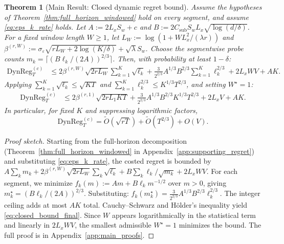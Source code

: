 \documentclass{article}
\newcommand{\DynReg}{\mathrm{DynReg}}
\newtheorem{theorem}{Theorem}
\begin{document}
\begin{theorem}[Main Result: Closed dynamic regret bound]
\label{thm:closed_dynamic_regret}
Assume the hypotheses of Theorem~\ref{thm:full_horizon_windowed} hold on every segment, and assume \eqref{eq:eps_k_rate} holds. Let
$A := 2L_x S_w + c$ and $B := 2 C_{\mathrm{sub}} S_w L_x \sqrt{\log(d/\delta)}$.
For a fixed window length $W\ge 1$, let $L_W := \log(1+WL_x^2/(\lambda r))$ and
$\beta^{(r,W)} := \sigma_\varepsilon\sqrt{rL_W + 2\log(K/\delta)} + \sqrt{\lambda}S_w$.
Choose the segmentwise probe counts
$m_k = \lceil (B\ell_k/(2A))^{2/3} \rceil$.
Then, with probability at least $1-\delta$:
\begin{align}
\DynReg_T^{(c)}
&\le
2\beta^{(r,W)} \sqrt{2rL_W} \sum_{k=1}^K \sqrt{\ell_k}
+ \frac{3}{2^{2/3}} A^{1/3} B^{2/3} \sum_{k=1}^K \ell_k^{2/3}
+ 2L_x W V + A K.
\label{eq:closed_bound_segmentwise}
\end{align}
Applying $\sum_{k=1}^K \sqrt{\ell_k} \le \sqrt{KT}$ and $\sum_{k=1}^K \ell_k^{2/3} \le K^{1/3}T^{2/3}$, and setting $W^\star = 1$:
\begin{align}
\DynReg_T^{(c)}
&\le
2\beta^{(r,1)} \sqrt{2rL_1KT}
+ \frac{3}{2^{2/3}} A^{1/3} B^{2/3} K^{1/3} T^{2/3}
+ 2L_x V + A K.
\label{eq:closed_bound_final}
\end{align}
In particular, for fixed $K$ and suppressing logarithmic factors,
\begin{equation}
\DynReg_T^{(c)} = \widetilde O\!\left(\sqrt{rT}\right) + \widetilde O\!\left(T^{2/3}\right) + O(V).
\label{eq:closed_bound_simplified}
\end{equation}
\end{theorem}

\begin{proof}[Proof sketch]
Starting from the full-horizon decomposition (Theorem~\ref{thm:full_horizon_windowed} in Appendix~\ref{app:supporting_regret}) and substituting \eqref{eq:eps_k_rate},
the costed regret is bounded by $A\sum_k m_k + 2\beta^{(r,W)}\sqrt{2rL_W}\sum_k \sqrt{\ell_k} + B\sum_k \ell_k/\sqrt{m_k} + 2L_xWV$.
For each segment, we minimize $f_k(m) := Am + B\ell_k m^{-1/2}$ over $m>0$, giving $m_k^\star = (B\ell_k/(2A))^{2/3}$.
Substituting: $f_k(m_k^\star) = \frac{3}{2^{2/3}}A^{1/3}B^{2/3}\ell_k^{2/3}$.
The integer ceiling adds at most $AK$ total.
Cauchy--Schwarz and H\"older's inequality yield \eqref{eq:closed_bound_final}.
Since $W$ appears logarithmically in the statistical term and linearly in $2L_xWV$, the smallest admissible $W^\star=1$ minimizes the bound.
The full proof is in Appendix~\ref{app:main_proofs}.
\end{proof}
\end{document}
